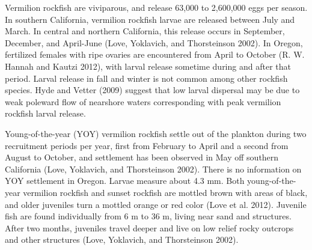 \documentclass[11pt,
  english,
  a4paper,
]{article}
\begin{document}

Vermilion rockfish are viviparous, and release 63,000 to 2,600,000 eggs per season. In southern California, vermilion rockfish larvae are released between July and March. In central and northern California, this release occurs in September, December, and April-June {(Love, Yoklavich, and Thorsteinson 2002)\leavevmode\tagmcend\tagstructend}. In Oregon, fertilized females with ripe ovaries are encountered from April to October {(R. W. Hannah and Kautzi 2012)\leavevmode\tagmcend\tagstructend}, with larval release sometime during and after that period. Larval release in fall and winter is not common among other rockfish species. Hyde and Vetter {(2009)\leavevmode\tagmcend\tagstructend} suggest that low larval dispersal may be due to weak poleward flow of nearshore waters corresponding with peak vermilion rockfish larval release.

\leavevmode\tagmcend\tagstructend\par


Young-of-the-year (YOY) vermilion rockfish settle out of the plankton during two recruitment periods per year, first from February to April and a second from August to October, and settlement has been observed in May off southern California {(Love, Yoklavich, and Thorsteinson 2002)\leavevmode\tagmcend\tagstructend}. There is no information on YOY settlement in Oregon. Larvae measure about 4.3 mm. Both young-of-the-year vermilion rockfish and sunset rockfish are mottled brown with areas of black, and older juveniles turn a mottled orange or red color {(Love et al. 2012)\leavevmode\tagmcend\tagstructend}. Juvenile fish are found individually from 6 m to 36 m, living near sand and structures. After two months, juveniles travel deeper and live on low relief rocky outcrops and other structures {(Love, Yoklavich, and Thorsteinson 2002)\leavevmode\tagmcend\tagstructend}.

\leavevmode\tagmcend\tagstructend\par

\end{document}
